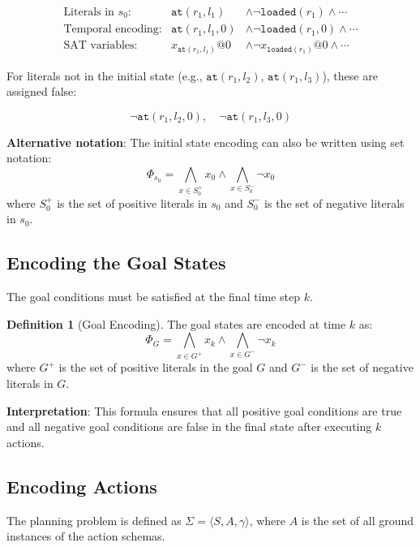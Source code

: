 \documentclass[11pt,a4paper]{article}
\theoremstyle{definition}
\newtheorem{definition}{Definition}[section]
\theoremstyle{plain}
\theoremstyle{remark}
\begin{document}
\[
\begin{array}{lcl}
\text{Literals in } s_0: & \texttt{at}(r_1, l_1) & \land \neg \texttt{loaded}(r_1) \land \cdots \\
\text{Temporal encoding:} & \texttt{at}(r_1, l_1, 0) & \land \neg \texttt{loaded}(r_1, 0) \land \cdots \\
\text{SAT variables:} & x_{\texttt{at}(r_1, l_1)}@0 & \land \neg x_{\texttt{loaded}(r_1)}@0 \land \cdots
\end{array}
\]

For literals not in the initial state (e.g., $\texttt{at}(r_1, l_2)$, $\texttt{at}(r_1, l_3)$), these are assigned false:

\[
\neg \texttt{at}(r_1, l_2, 0), \quad \neg \texttt{at}(r_1, l_3, 0)
\]

\textbf{Alternative notation}: The initial state encoding can also be written using set notation:
\[
\Phi_{s_0} = \bigwedge_{x \in S_0^+} x_0 \land \bigwedge_{x \in S_0^-} \neg x_0
\]
where $S_0^+$ is the set of positive literals in $s_0$ and $S_0^-$ is the set of negative literals in $s_0$.

\subsection{Encoding the Goal States}

The goal conditions must be satisfied at the final time step $k$.

\begin{tcolorbox}[colback=green!5!white,colframe=green!75!black,title=\textbf{Goal Encoding}]
\begin{definition}[Goal Encoding]
The goal states are encoded at time $k$ as:
\[
\Phi_G = \bigwedge_{x \in G^+} x_k \land \bigwedge_{x \in G^-} \neg x_k
\]
where $G^+$ is the set of positive literals in the goal $G$ and $G^-$ is the set of negative literals in $G$.
\end{definition}
\end{tcolorbox}

\textbf{Interpretation}: This formula ensures that all positive goal conditions are true and all negative goal conditions are false in the final state after executing $k$ actions.

\subsection{Encoding Actions}

The planning problem is defined as $\Sigma = \langle S, A, \gamma \rangle$, where $A$ is the set of all ground instances of the action schemas.
\end{document}
